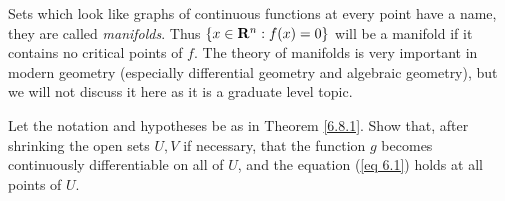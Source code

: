 \begin{remark}\label{6.8.4}
    Sets which look like graphs of continuous functions at every point have a name, they are called \emph{manifolds}.
    Thus \(\{x \in \mathbf{R}^n : f(x) = 0\}\) will be a manifold if it contains no critical points of \(f\).
    The theory of manifolds is very important in modern geometry (especially differential geometry and algebraic geometry), but we will not discuss it here as it is a graduate level topic.
\end{remark}

\exercisesection

\begin{exercise}\label{ex 6.8.1}
    Let the notation and hypotheses be as in Theorem \ref{6.8.1}.
    Show that, after shrinking the open sets \(U, V\) if necessary, that the function \(g\) becomes continuously differentiable on all of \(U\), and the equation (\ref{eq 6.1}) holds at all points of \(U\).
\end{exercise}